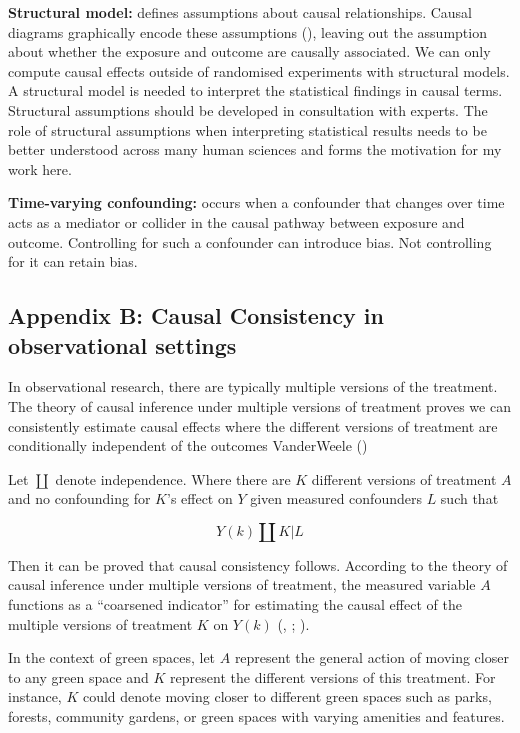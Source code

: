 \documentclass[
  singlecolumn]{article}
\begin{document}
\textbf{Structural model:} defines assumptions about causal
relationships. Causal diagrams graphically encode these assumptions
(), leaving out the
assumption about whether the exposure and outcome are causally
associated. We can only compute causal effects outside of randomised
experiments with structural models. A structural model is needed to
interpret the statistical findings in causal terms. Structural
assumptions should be developed in consultation with experts. The role
of structural assumptions when interpreting statistical results needs to
be better understood across many human sciences and forms the motivation
for my work here.

\textbf{Time-varying confounding:} occurs when a confounder that changes
over time acts as a mediator or collider in the causal pathway between
exposure and outcome. Controlling for such a confounder can introduce
bias. Not controlling for it can retain bias.

\newpage{}

\subsection{Appendix B: Causal Consistency in observational
settings}\label{appendix-b}

In observational research, there are typically multiple versions of the
treatment. The theory of causal inference under multiple versions of
treatment proves we can consistently estimate causal effects where the
different versions of treatment are conditionally independent of the
outcomes VanderWeele ()

Let \(\coprod\) denote independence. Where there are \(K\) different
versions of treatment \(A\) and no confounding for \(K\)'s effect on
\(Y\) given measured confounders \(L\) such that

\[
Y(k) \coprod K | L
\]

Then it can be proved that causal consistency follows. According to the
theory of causal inference under multiple versions of treatment, the
measured variable \(A\) functions as a ``coarsened indicator'' for
estimating the causal effect of the multiple versions of treatment \(K\)
on \(Y(k)\) (,
;
).

In the context of green spaces, let \(A\) represent the general action
of moving closer to any green space and \(K\) represent the different
versions of this treatment. For instance, \(K\) could denote moving
closer to different green spaces such as parks, forests, community
gardens, or green spaces with varying amenities and features.
\end{document}
